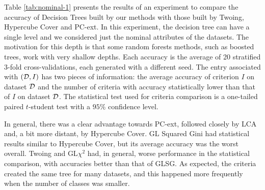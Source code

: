 Table \ref{tab:nominal-1} presents  the results of an experiment to
compare the accuracy of  Decision Trees built by  our methods with those built by Twoing, Hypercube Cover and PC-ext.
In this experiment, the decision tree can have a single level and we considered just the nominal attributes of the datasets. 
The motivation for this depth is that some random
forests methods, such as boosted trees, work with very shallow depths.
Each accuracy is the average of 20 stratified 3-fold cross-validations,
each generated with a different seed.
The entry  associated with  $({\cal D},I)$ has two pieces of information: the average accuracy
of criterion $I$ on dataset ${\cal D}$ and the number of criteria
with accuracy   statistically lower than that of $I$ on dataset ${\cal D}$. 
The statistical test used for criteria comparison is a  one-tailed paired $t$-student test with a $95\% $ confidence level. 

In general, there was a clear advantage towards PC-ext, followed closely by LCA and, a bit more distant, by Hypercube Cover. GL Squared Gini had statistical results similar to Hypercube Cover, but its average accuracy was the worst overall. Twoing and GL$\chi^2$ had, in general, worse performance in the statistical comparison, with accuracies better than that of GLSG. As expected, the criteria created the same tree for many datasets, and this happened more frequently when the number of classes was smaller.

